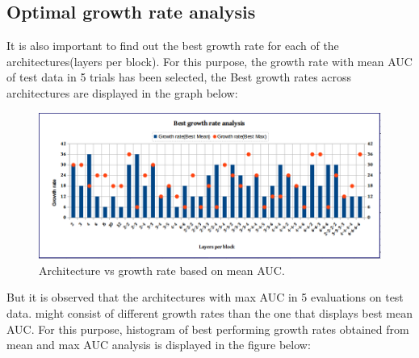 \subsection{Optimal growth rate analysis}
It is also important to find out the best growth rate for each of the architectures(layers per block). For this purpose, the growth rate with mean AUC of test data in 5 trials has been selected,
the Best growth rates across architectures are displayed in the graph below:

\begin{figure}[ht]
\centering
\includegraphics[width=1\textwidth]{images/densenet/best_growthrate_analysis.png}
\caption{\label{fig:best_growthrate}Architecture vs growth rate based on mean AUC.}
\end{figure}

But it is observed that the architectures with max AUC in 5 evaluations on test data. might consist of different growth rates than the one that displays best mean AUC. For this purpose, histogram of 
best performing growth rates obtained from mean and max AUC analysis is displayed in the figure below:

